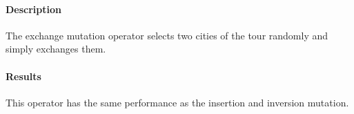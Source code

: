 ﻿\documentclass[a4paper,english,11pt,]{scrartcl}
\begin{document}
\paragraph{Description}
The exchange mutation operator selects two cities of the tour randomly and simply exchanges them. 


\paragraph{Results}
This operator has the same performance as the insertion and inversion mutation.

% 







% 
\end{document}
